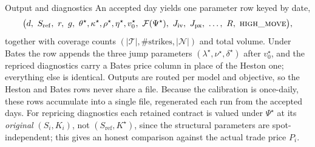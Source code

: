 \documentclass[a4paper, 11pt, reqno]{amsart}
\makeatletter
\def\section{\@startsection{section}{1}%
  \z@{.7\linespacing\@plus\linespacing}{.5\linespacing}%
  {\normalfont\bfseries\centering}}
\makeatother
\begin{document}
	\section{Output and diagnostics}\label{sec:output}
		An accepted day yields one parameter row keyed by date,
		\begin{equation}
			\bigl(d,\ S_{\mathrm{ref}},\ r,\ g,\ \theta^\star,\kappa^\star,\rho^\star,\eta^\star,v_0^\star,\
			\mathcal{F}(\Psi^\star),\ J_{\mathrm{iv}},\ J_{\mathrm{px}},\ \dots,\ R,\ \textsc{high\_move}\bigr),
		\end{equation}
		together with coverage counts $(|\mathcal{T}|, \#\text{strikes}, |\mathcal{N}|)$ and total
		volume. Under Bates the row appends the three jump parameters $(\lambda^\star,\nu^\star,\delta^\star)$
		after $v_0^\star$, and the repriced diagnostics carry a Bates price column in place of the Heston
		one; everything else is identical. Outputs are routed per model and objective, so the Heston and
		Bates rows never share a file. Because the calibration is once-daily, these rows accumulate into a
		single file, regenerated each run from the accepted days. For repricing diagnostics each retained contract
		is valued under $\Psi^\star$ at its \emph{original} $(S_i,K_i)$, not $(S_{\mathrm{ref}},K^\star)$,
		since the structural parameters are spot-independent; this gives an honest comparison against
		the actual trade price $P_i$.
\end{document}
